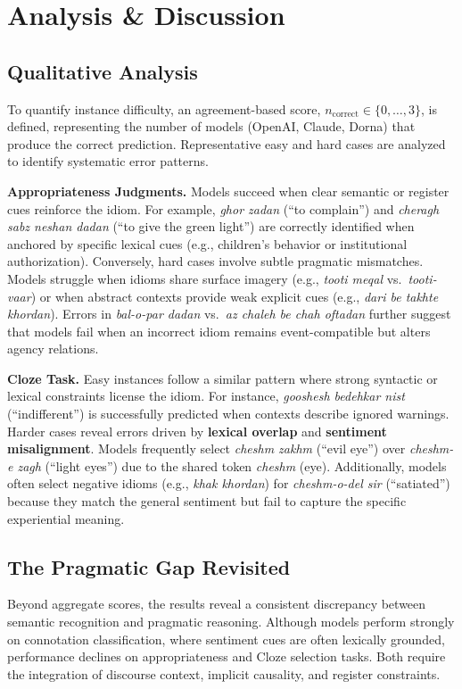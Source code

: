 \documentclass[11pt,a4paper]{article}
\begin{document}
\section{Analysis \& Discussion}

\subsection{Qualitative Analysis}
To quantify instance difficulty, an agreement-based score, $n_{\text{correct}} \in \{0, \dots, 3\}$, is defined, representing the number of models (OpenAI, Claude, Dorna) that produce the correct prediction. Representative easy and hard cases are analyzed to identify systematic error patterns.

\textbf{Appropriateness Judgments.} 
Models succeed when clear semantic or register cues reinforce the idiom. For example, \textit{ghor zadan} (``to complain'') and \textit{cheragh sabz neshan dadan} (``to give the green light'') are correctly identified when anchored by specific lexical cues (e.g., children's behavior or institutional authorization). Conversely, hard cases involve subtle pragmatic mismatches. Models struggle when idioms share surface imagery (e.g., \textit{tooti meqal} vs.\ \textit{tooti-vaar}) or when abstract contexts provide weak explicit cues (e.g., \textit{dari be takhte khordan}). Errors in \textit{bal-o-par dadan} vs.\ \textit{az chaleh be chah oftadan} further suggest that models fail when an incorrect idiom remains event-compatible but alters agency relations.

\textbf{Cloze Task.} 
Easy instances follow a similar pattern where strong syntactic or lexical constraints license the idiom. For instance, \textit{gooshesh bedehkar nist} (``indifferent'') is successfully predicted when contexts describe ignored warnings. Harder cases reveal errors driven by \textbf{lexical overlap} and \textbf{sentiment misalignment}. Models frequently select \textit{cheshm zakhm} (``evil eye'') over \textit{cheshm-e zagh} (``light eyes'') due to the shared token \textit{cheshm} (eye). Additionally, models often select negative idioms (e.g., \textit{khak khordan}) for \textit{cheshm-o-del sir} (``satiated'') because they match the general sentiment but fail to capture the specific experiential meaning.

\subsection{The Pragmatic Gap Revisited}
Beyond aggregate scores, the results reveal a consistent discrepancy between semantic recognition and pragmatic reasoning. Although models perform strongly on connotation classification, where sentiment cues are often lexically grounded, performance declines on appropriateness and Cloze selection tasks. Both require the integration of discourse context, implicit causality, and register constraints.
\end{document}
